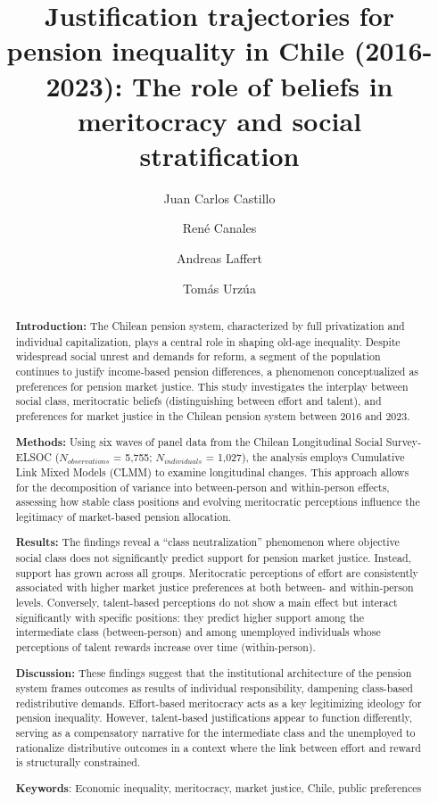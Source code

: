 \documentclass[
  12pt,
]{article}
\title{Justification trajectories for pension inequality in Chile
(2016-2023): The role of beliefs in meritocracy and social
stratification}
\author{Juan Carlos Castillo}
\affil{%
                  Departament of Sociology, University of Chile
              }
\author{René Canales}
\affil{%
                  Institute of Sociology, Pontifical Catholic University
                  of Chile
              }
\author{Andreas Laffert}
\affil{%
                  Institute of Sociology, Pontifical Catholic University
                  of Chile
              }
\author{Tomás Urzúa}
\affil{%
                  Departament of Sociology, University of Chile
              }
\date{}
\begin{document}
\maketitle
\begin{abstract}
\textbf{Introduction:} The Chilean pension system, characterized by full
privatization and individual capitalization, plays a central role in
shaping old-age inequality. Despite widespread social unrest and demands
for reform, a segment of the population continues to justify
income-based pension differences, a phenomenon conceptualized as
preferences for pension market justice. This study investigates the
interplay between social class, meritocratic beliefs (distinguishing
between effort and talent), and preferences for market justice in the
Chilean pension system between 2016 and 2023.

\textbf{Methods:} Using six waves of panel data from the Chilean
Longitudinal Social Survey-ELSOC (\(N_{observations}\) = 5,755;
\(N_{individuals}\) = 1,027), the analysis employs Cumulative Link Mixed
Models (CLMM) to examine longitudinal changes. This approach allows for
the decomposition of variance into between-person and within-person
effects, assessing how stable class positions and evolving meritocratic
perceptions influence the legitimacy of market-based pension allocation.

\textbf{Results:} The findings reveal a ``class neutralization''
phenomenon where objective social class does not significantly predict
support for pension market justice. Instead, support has grown across
all groups. Meritocratic perceptions of effort are consistently
associated with higher market justice preferences at both between- and
within-person levels. Conversely, talent-based perceptions do not show a
main effect but interact significantly with specific positions: they
predict higher support among the intermediate class (between-person) and
among unemployed individuals whose perceptions of talent rewards
increase over time (within-person).

\textbf{Discussion:} These findings suggest that the institutional
architecture of the pension system frames outcomes as results of
individual responsibility, dampening class-based redistributive demands.
Effort-based meritocracy acts as a key legitimizing ideology for pension
inequality. However, talent-based justifications appear to function
differently, serving as a compensatory narrative for the intermediate
class and the unemployed to rationalize distributive outcomes in a
context where the link between effort and reward is structurally
constrained.

\textbf{Keywords}: Economic inequality, meritocracy, market justice,
Chile, public preferences
\end{abstract}
\end{document}
